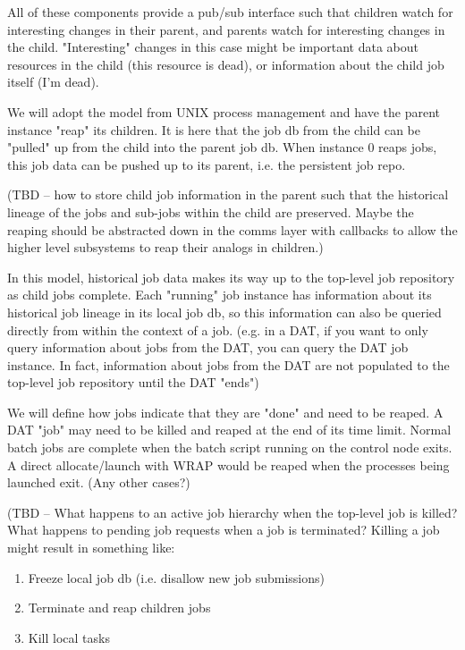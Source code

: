 All of these components provide a pub/sub interface such that children
watch for interesting changes in their parent, and parents watch for
interesting changes in the child. "Interesting" changes in this case
might be important data about resources in the child (this resource is
dead), or information about the child job itself (I'm dead).

We will adopt the model from UNIX process management and have the
parent instance "reap" its children. It is here that the job db from
the child can be "pulled" up from the child into the parent job db.
When instance 0 reaps jobs, this job data can be pushed up to its
parent, i.e. the persistent job repo.

(TBD -- how to store child job information in the parent such that the
historical lineage of the jobs and sub-jobs within the child are
preserved.  Maybe the reaping should be abstracted down in the comms
layer with callbacks to allow the higher level subsystems to reap
their analogs in children.)

In this model, historical job data makes its way up to the top-level
job repository as child jobs complete. Each "running" job instance has
information about its historical job lineage in its local job db, so
this information can also be queried directly from within the context
of a job. (e.g. in a DAT, if you want to only query information about
jobs from the DAT, you can query the DAT job instance. In fact,
information about jobs from the DAT are not populated to the top-level
job repository until the DAT "ends")

We will define how jobs indicate that they are "done" and need to be
reaped. A DAT "job" may need to be killed and reaped at the end of its
time limit. Normal batch jobs are complete when the batch script
running on the control node exits. A direct allocate/launch with WRAP
would be reaped when the processes being launched exit. (Any other
cases?)

(TBD -- What happens to an active job hierarchy when the top-level job
is killed?  What happens to pending job requests when a job is
terminated?  Killing a job might result in something like:

\begin{enumerate}
\item Freeze local job db (i.e. disallow new job submissions)
\item Terminate and reap children jobs
\item Kill local tasks
\end{enumerate}

